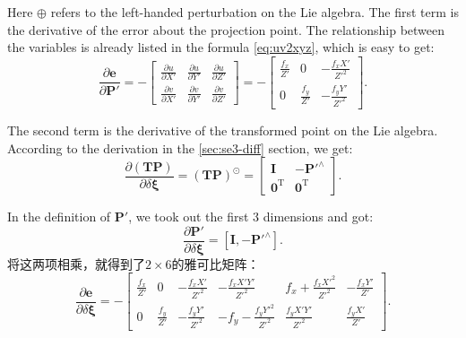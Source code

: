 Here $\oplus$ refers to the left-handed perturbation on the Lie algebra. The first term is the derivative of the error about the projection point. The relationship between the variables is already listed in the formula \eqref{eq:uv2xyz}, which is easy to get:
\begin{equation}
\frac{{\partial \bm{e}}}{{\partial \bm{P}'}} = -\left[
{\begin{array}{*{20}{c}}
{\frac{{\partial u}}{{\partial X'}}}&{\frac{{\partial u}}{{\partial Y'}}}&{\frac{{\partial u}} {{\partial Z'}}}\\
{\frac{{\partial v}}{{\partial X'}}}&{\frac{{\partial v}}{{\partial Y'}}}&{\frac{{\partial v}} {{\partial Z'}}}
\end{array}} \right]
= - \left[ {\begin{array}{*{20}{c}}
{\frac{{{f_x}}}{Z'}}&0&{ - \frac{{{f_x}X'}}{{{Z'^2}}}}\\
0&{\frac{{{f_y}}}{Z'}}&{ - \frac{{{f_y}Y'}}{Z'^2}}
\end{array}} \right].
\end{equation}

The second term is the derivative of the transformed point on the Lie algebra. According to the derivation in the \ref{sec:se3-diff} section, we get:
\begin{equation}
\frac{{\partial \left( \bm{TP} \right)}}{{\partial \delta \boldsymbol{\xi} }} = {\left( \bm{TP} \right)^ \odot } = \left[
\begin{array}{*{20}{cc}}
\bm{I} &- \bm{P}'^ \wedge \\
\bm{0}^\mathrm{T} &\bm{0}^\mathrm{T}
\end{array}
\right].
\end{equation}

In the definition of $\bm{P}'$, we took out the first 3 dimensions and got:
\begin{equation}
\frac{{\partial \bm{P}'}}{{\partial \delta \boldsymbol{\xi} }} = \left[ { \bm{I}, - {\bm{P}'^ \wedge }} \right].
\end{equation}
将这两项相乘，就得到了$2 \times 6$的雅可比矩阵：
\begin{equation}
\label{eq:jacob-uv2xi}
\frac{{\partial \bm{e}}}{{\partial \delta \boldsymbol{\xi} }} = - \left[ {\begin{array}{*{20}{c}}
	{\frac{{{f_x}}}{Z'}}&0&{ - \frac{{{f_x}X'}}{{{Z'^2}}}}&{ - \frac{{{f_x}X'Y'}}{{{Z'^2}}}}&{{f_x} + \frac{{{f_x}{X'^2}}}{{{Z'^2}}}}&{ - \frac{{{f_x}Y'}}{Z'}}\\
	0&{\frac{{{f_y}}}{Z'}}&{ - \frac{{{f_y}Y'}}{{{Z'^2}}}}&{ - {f_y} - \frac{{{f_y}{Y'^2}}}{{{Z'^2}}}}&{\frac{{{f_y}X'Y'}}{{{Z'^2}}}}&{\frac{{{f_y}X'}}{Z'}}
	\end{array}} \right].
\end{equation}

